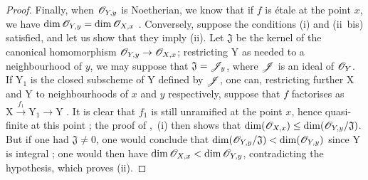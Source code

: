\begin{proof}
Finally, when $\mathscr{O}_{Y,y}$ is Noetherian, we know that if $f$ is \'etale at the point $x$, we have $\dim\mathscr{O}_{Y,y}=\dim\mathscr{O}_{X,x}$ .
Conversely, suppose the conditions (i) and (ii~bis) satisfied, and let us show that they imply (ii).
Let $\mathfrak{J}$ be the kernel of the canonical homomorphism $\mathscr{O}_{Y,y}\to\mathscr{O}_{X,x}$; restricting Y as needed to a neighbourhood of $y$, we may suppose that $\mathfrak{J}=\mathscr{J}_y$, where $\mathscr{J}$ is an ideal of $\mathscr{O}_Y$.
If $\mathrm{Y}_1$ is the closed subscheme of $\mathrm{Y}$ defined by $\mathscr{J}$, one can, restricting further $\mathrm{X}$ and $\mathrm{Y}$ to neighbourhoods of $x$ and $y$ respectively, suppose that $f$ factorises as $\mathrm{X}\xrightarrow{f_1}\mathrm{Y}_1\to\mathrm{Y}$ .
It is clear that $f_1$ is still unramified at the point $x$, hence quasi-finite at this point ; the proof of ,~(i) then shows that $\dim(\mathscr{O}_{X,x})\leq\dim(\mathscr{O}_{Y,y}/\mathfrak{J})$.
But if one had $\mathfrak{J}\neq 0$, one would conclude that $\dim(\mathscr{O}_{Y,y}/\mathfrak{J})<\dim(\mathscr{O}_{Y,y})$ since $\mathrm{Y}$ is integral ; one would then have $\dim\mathscr{O}_{X,x}<\dim\mathscr{O}_{Y,y}$, contradicting the hypothesis, which proves (ii).
\end{proof}


